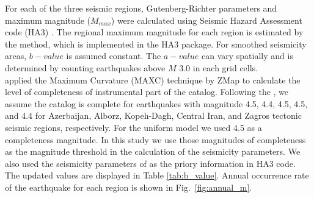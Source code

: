 For each of the three seismic regions, Gutenberg-Richter parameters and maximum magnitude ($M_{max}$) were calculated using Seismic Hazard Assessment code (HA3) \citep{kijko2004}. The regional maximum magnitude for each region is estimated by the \citet{Kijko1989} method, which is implemented in the HA3 package. For smoothed seismicity areas, $b-value$ is assumed constant. The $a-value$ can vary spatially and is determined by counting earthquakes above $M$ 3.0 in each grid cells.\\
\noindent
\citet{Karimiparidari2013} applied the Maximum Curvature (MAXC) technique \citep{Wyss1999, Wiemer2000} by ZMap \citep{Wiemer2001} to calculate the level of completeness of instrumental part of the catalog.  Following the \citet{Karimiparidari2013}, we assume the catalog is complete for earthquakes with magnitude 4.5, 4.4, 4.5, 4.5, and 4.4 for Azerbaijan, Alborz,  Kopeh-Dagh, Central Iran, and Zagros tectonic seismic regions, respectively. For the uniform model we used 4.5 as a completeness magnitude. In this study we use those magnitudes of completeness as the magnitude threshold in the calculation of the seismicity parameters. We also used the seismicity parameters of \citet{Karimiparidari2013} as the priory information in HA3 code. The updated values are displayed in Table \ref{tab:b_value}.  Annual occurrence rate of the earthquake for each region is shown in Fig.~\ref{fig:annual_m}.




